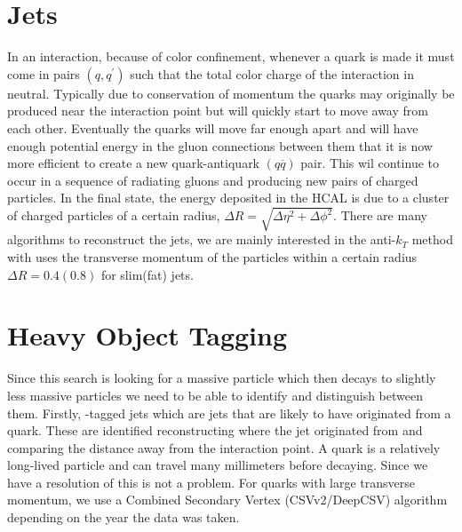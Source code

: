\section{Jets}\label{Jets}
In an interaction, because of color confinement, whenever a quark is made it must come in pairs $(q, q^\prime)$ such that the total color charge of the interaction in neutral. Typically due to conservation of momentum the quarks may originally be produced near the interaction point but will quickly start to move away from each other. Eventually the quarks will move far enough apart and will have enough potential energy in the gluon connections between them that it is now more efficient to create a new quark-antiquark $(q\overline{q})$ pair. This wil continue to occur in a sequence of radiating gluons and producing new pairs of charged particles. In the final state, the energy deposited in the HCAL is due to a cluster of charged particles of a certain radius, $\Delta R=\sqrt{\Delta\eta^2+\Delta\phi^2}$. There are many algorithms to reconstruct the jets, we are mainly interested in the anti-$k_T$ method with uses the transverse momentum of the particles within a certain radius $\Delta R = 0.4 (0.8)$ for slim(fat) jets. 

\section{Heavy Object Tagging}\label{HeavyObject}
Since this search is looking for a massive particle which then decays to slightly less massive particles we need to be able to identify and distinguish between them. Firstly, \bquark-tagged jets which are jets that are likely to have originated from a \bquark quark. These are identified reconstructing where the jet originated from and comparing the distance away from the interaction point. A \bquark quark is a relatively long-lived particle and can travel many millimeters before decaying. Since we have a resolution of \mum this is not a problem. For \bquark quarks with large transverse momentum, we use a Combined Secondary Vertex (CSVv2/DeepCSV) algorithm depending on the year the data was taken. 

